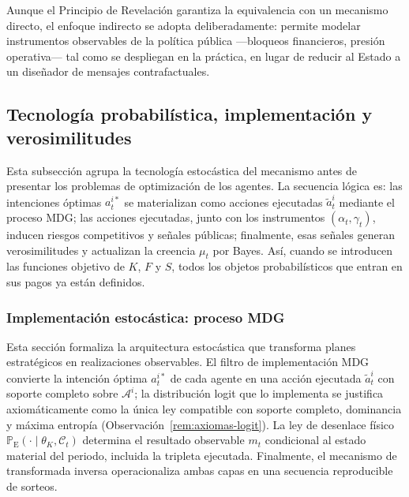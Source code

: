 \documentclass[12pt]{article}
\theoremstyle{definition}
\theoremstyle{remark}
\newcommand{\ProbE}{\mathbb{P}_{\mathrm{E}}}
\newcommand{\1}{\mathbf{1}}
\begin{document}
\noindent Aunque el Principio de Revelación garantiza la equivalencia con un mecanismo directo, el enfoque indirecto se adopta deliberadamente: permite modelar instrumentos observables de la política pública ---bloqueos financieros, presión operativa--- tal como se despliegan en la práctica, en lugar de reducir al Estado a un diseñador de mensajes contrafactuales.


\subsection{Tecnología probabilística, implementación y verosimilitudes}
\label{sec:probability-technology}

Esta subsección agrupa la tecnología estocástica del mecanismo antes de presentar los problemas de optimización de los agentes. La secuencia lógica es: las intenciones óptimas $a_t^{i\ast}$ se materializan como acciones ejecutadas $\tilde a_t^i$ mediante el proceso MDG; las acciones ejecutadas, junto con los instrumentos $(\alpha_t,\gamma_t)$, inducen riesgos competitivos y señales públicas; finalmente, esas señales generan verosimilitudes y actualizan la creencia $\mu_t$ por Bayes. Así, cuando se introducen las funciones objetivo de $K$, $F$ y $S$, todos los objetos probabilísticos que entran en sus pagos ya están definidos.

\subsubsection{Implementación estocástica: proceso MDG}
\label{subsec:discrete}
\label{sec:estructura-juego}
\label{sec:mano-de-dios}

Esta sección formaliza la arquitectura estocástica que transforma planes estratégicos en realizaciones observables. El filtro de implementación MDG convierte la intención óptima $a_t^{i\ast}$ de cada agente en una acción ejecutada $\tilde{a}_t^i$ con soporte completo sobre $\mathcal{A}^i$; la distribución logit que lo implementa se justifica axiomáticamente como la única ley compatible con soporte completo, dominancia y máxima entropía \textup{(}Observación~\ref{rem:axiomas-logit}\textup{)}. La ley de desenlace físico $\ProbE(\cdot\mid\theta_K,\mathcal C_t)$ determina el resultado observable $m_t$ condicional al estado material del periodo, incluida la tripleta ejecutada. Finalmente, el mecanismo de transformada inversa operacionaliza ambas capas en una secuencia reproducible de sorteos.
\end{document}
